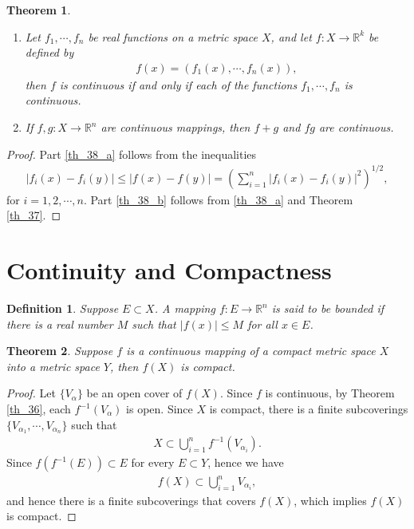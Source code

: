 \documentclass[10pt]{book}
\newtheorem{definition}{Definition}[chapter]
\newtheorem{theorem}{Theorem}[chapter]
\theoremstyle{definition}
\numberwithin{equation}{chapter}
\begin{document}
\begin{theorem}\label{th_38}
~\begin{enumerate}[label=(\alph*)]
    \item Let $f_1, \cdots, f_n$ be real functions on a metric space $X$, and let $f: X \to \mathbb{R}^k$ be defined by
    \begin{align*}
        f(x) = \left(f_1(x), \cdots, f_n(x)\right),
    \end{align*}
    then $f$ is continuous if and only if each of the functions $f_1, \cdots, f_n$ is continuous. \label{th_38_a}
    
    \item If $f,g: X \to \mathbb{R}^n$ are continuous mappings, then $f + g$ and $fg$ are continuous. \label{th_38_b}
\end{enumerate}
\end{theorem}
\begin{proof}
Part \ref{th_38_a} follows from the inequalities
\begin{align*}
    \left|f_i(x) - f_i(y)\right| \leq \left|f(x) - f(y)\right| = \left(\sum^n_{i=1} \left|f_i(x) - f_i(y)\right|^2\right)^{1/2},
\end{align*}
for $i = 1,2,\cdots,n$. Part \ref{th_38_b} follows from \ref{th_38_a} and Theorem \ref{th_37}.
\end{proof}

\medskip




\section{Continuity and Compactness}

\begin{definition}
Suppose $E \subset X$. A mapping $f: E \to \mathbb{R}^n$ is said to be bounded if there is a real number $M$ such that $\left|f(x)\right| \leq M$ for all $x \in E$. 
\end{definition}

\medskip

\begin{theorem}\label{th_39}
Suppose $f$ is a continuous mapping of a compact metric space $X$ into a metric space $Y$, then $f(X)$ is compact.
\end{theorem}
\begin{proof}
Let $\{V_{\alpha}\}$ be an open cover of $f(X)$. Since $f$ is continuous, by Theorem \ref{th_36}, each $f^{-1}(V_{\alpha})$ is open. Since $X$ is compact, there is a finite subcoverings $\{V_{\alpha_1}, \cdots, V_{\alpha_n}\}$ such that
\begin{align*}
    X \subset \bigcup^n_{i=1} f^{-1}(V_{\alpha_i}).
\end{align*}
Since $f\left(f^{-1}(E)\right) \subset E$ for every $E \subset Y$, hence we have
\begin{align*}
    f(X) \subset \bigcup^n_{i=1} V_{\alpha_i},
\end{align*}
and hence there is a finite subcoverings that covers $f(X)$, which implies $f(X)$ is compact.
\end{proof}
\end{document}
